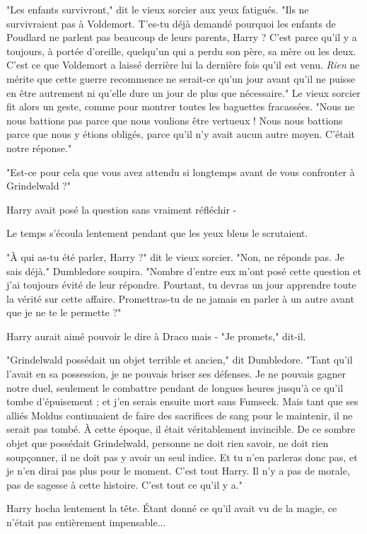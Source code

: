 "Les enfants survivront," dit le vieux sorcier aux yeux fatigués. "Ils ne survivraient pas à Voldemort. T'es-tu déjà demandé pourquoi les enfants de Poudlard ne parlent pas beaucoup de leurs parents, Harry ? C'est parce qu'il y a toujours, à portée d'oreille, quelqu'un qui a perdu son père, sa mère ou les deux. C'est ce que Voldemort a laissé derrière lui la dernière fois qu'il est venu. \emph{Rien}  ne mérite que cette guerre recommence ne serait-ce qu'un jour avant qu'il ne puisse en être autrement ni qu'elle dure un jour de plus que nécessaire." Le vieux sorcier fit alors un geste, comme pour montrer toutes les baguettes fracassées. "Nous ne nous battions pas parce que nous voulions être vertueux ! Nous nous battions parce que nous y étions obligés, parce qu'il n'y avait aucun autre moyen. C'était notre réponse."

"Est-ce pour cela que vous avez attendu si longtemps avant de vous confronter à Grindelwald ?"

Harry avait posé la question sans vraiment réfléchir -

Le temps s'écoula lentement pendant que les yeux bleus le scrutaient.

"À qui as-tu été parler, Harry ?" dit le vieux sorcier. "Non, ne réponds pas. Je sais déjà." Dumbledore soupira. "Nombre d'entre eux m'ont posé cette question et j'ai toujours évité de leur répondre. Pourtant, tu devras un jour apprendre toute la vérité sur cette affaire. Promettras-tu de ne jamais en parler à un autre avant que je ne te le permette ?"

Harry aurait aimé pouvoir le dire à Draco mais - "Je promets," dit-il.

"Grindelwald possédait un objet terrible et ancien," dit Dumbledore. "Tant qu'il l'avait en sa possession, je ne pouvais briser ses défenses. Je ne pouvais gagner notre duel, seulement le combattre pendant de longues heures jusqu'à ce qu'il tombe d'épuisement ; et j'en serais ensuite mort sans Fumseck. Mais tant que ses alliés Moldus continuaient de faire des sacrifices de sang pour le maintenir, il ne serait pas tombé. À cette époque, il était véritablement invincible. De ce sombre objet que possédait Grindelwald, personne ne doit rien savoir, ne doit rien soupçonner, il ne doit pas y avoir un seul indice. Et tu n'en parleras donc pas, et je n'en dirai pas plus pour le moment. C'est tout Harry. Il n'y a pas de morale, pas de sagesse à cette histoire. C'est tout ce qu'il y a."

Harry hocha lentement la tête. Étant donné ce qu'il avait vu de la magie, ce n'était pas entièrement impensable...


